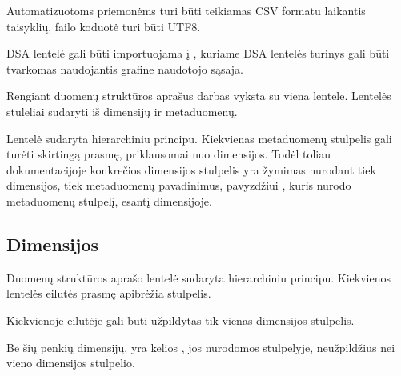 \documentclass[letterpaper,10pt,lithuanian]{sphinxmanual}
\begin{document}
\sphinxAtStartPar
Automatizuotoms priemonėms {\hyperref[\detokenize{savokos:term-DSA}]{}} turi būti teikiamas CSV formatu laikantis
 taisyklių, failo koduotė turi būti UTF\sphinxhyphen{}8.

\sphinxAtStartPar
DSA lentelė gali būti importuojama į , kuriame DSA lentelės
turinys gali būti tvarkomas naudojantis grafine naudotojo sąsaja.

\sphinxAtStartPar
Rengiant duomenų struktūros aprašus darbas vyksta su viena lentele. Lentelės
stuleliai sudaryti iš dimensijų ir metaduomenų.

\noindent{}

\sphinxAtStartPar
Lentelė sudaryta hierarchiniu principu. Kiekvienas metaduomenų stulpelis gali
turėti skirtingą prasmę, priklausomai nuo dimensijos. Todėl toliau
dokumentacijoje konkrečios dimensijos stulpelis yra žymimas nurodant tiek
dimensijos, tiek metaduomenų pavadinimus, pavyzdžiui {\hyperref[\detokenize{dimensijos:property.type}]{}},
kuris nurodo {\hyperref[\detokenize{tipai:module-type}]{}} metaduomenų stulpelį, esantį {\hyperref[\detokenize{formatas:property}]{}}
dimensijoje.


\subsection{Dimensijos}
\label{\detokenize{formatas:dimensijos}}\label{\detokenize{formatas:dimensijos-stulpeliai}}
\sphinxAtStartPar
Duomenų struktūros aprašo lentelė sudaryta hierarchiniu principu. Kiekvienos
lentelės eilutės prasmę apibrėžia {\hyperref[\detokenize{dimensijos:dimensijos}]{}} stulpelis.

\sphinxAtStartPar
Kiekvienoje eilutėje gali būti užpildytas tik vienas dimensijos stulpelis.

\sphinxAtStartPar
Be šių penkių dimensijų, yra kelios {\hyperref[\detokenize{dimensijos:papildomos-dimensijos}]{}}, jos nurodomos {\hyperref[\detokenize{tipai:module-type}]{}} stulpelyje, neužpildžius
nei vieno dimensijos stulpelio.
\end{document}
